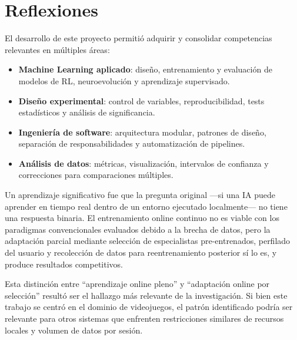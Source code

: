 \section{Reflexiones}

El desarrollo de este proyecto permitió adquirir y consolidar competencias relevantes en múltiples áreas:

\begin{itemize}
    \item \textbf{Machine Learning aplicado}: diseño, entrenamiento y evaluación de modelos de RL, neuroevolución y aprendizaje supervisado.
    \item \textbf{Diseño experimental}: control de variables, reproducibilidad, tests estadísticos y análisis de significancia.
    \item \textbf{Ingeniería de software}: arquitectura modular, patrones de diseño, separación de responsabilidades y automatización de pipelines.
    \item \textbf{Análisis de datos}: métricas, visualización, intervalos de confianza y correcciones para comparaciones múltiples.
\end{itemize}

Un aprendizaje significativo fue que la pregunta original ---si una IA puede aprender en tiempo real dentro de un entorno ejecutado localmente--- no tiene una respuesta binaria. El entrenamiento online continuo no es viable con los paradigmas convencionales evaluados debido a la brecha de datos, pero la adaptación parcial mediante selección de especialistas pre-entrenados, perfilado del usuario y recolección de datos para reentrenamiento posterior sí lo es, y produce resultados competitivos.

Esta distinción entre ``aprendizaje online pleno'' y ``adaptación online por selección'' resultó ser el hallazgo más relevante de la investigación. Si bien este trabajo se centró en el dominio de videojuegos, el patrón identificado podría ser relevante para otros sistemas que enfrenten restricciones similares de recursos locales y volumen de datos por sesión.
